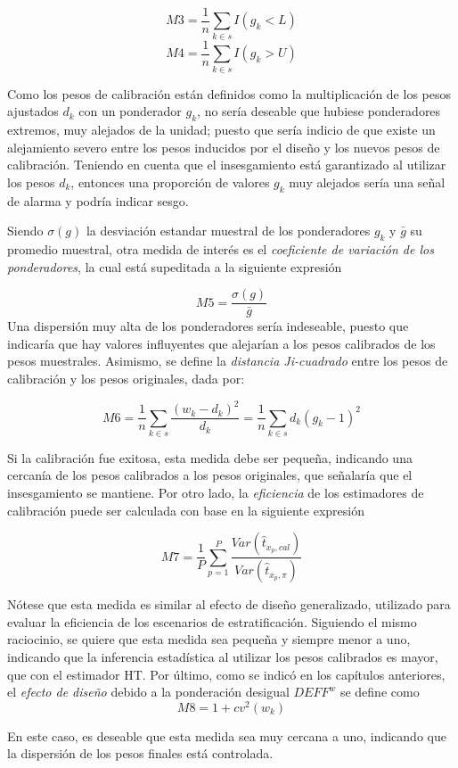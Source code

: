 \documentclass[
  12pt,
]{book}
\begin{document}
\[
M3 = \frac{1}{n} \sum_{k \in s}I(g_k<L)
\]
\[
M4= \frac{1}{n} \sum_{k \in s}I(g_k>U)
\]

Como los pesos de calibración están definidos como la multiplicación de los pesos ajustados \(d_{k}\) con un ponderador \(g_k\), no sería deseable que hubiese ponderadores extremos, muy alejados de la unidad; puesto que sería indicio de que existe un alejamiento severo entre los pesos inducidos por el diseño y los nuevos pesos de calibración. Teniendo en cuenta que el insesgamiento está garantizado al utilizar los pesos \(d_k\), entonces una proporción de valores \(g_k\) muy alejados sería una señal de alarma y podría indicar sesgo.

Siendo \(\sigma(g)\) la desviación estandar muestral de los ponderadores \(g_k\) y \(\bar{g}\) su promedio muestral, otra medida de interés es el \emph{coeficiente de variación de los ponderadores}, la cual está supeditada a la siguiente expresión

\[
M5= \frac{\sigma(g)}{\bar{g}}
\]
Una dispersión muy alta de los ponderadores sería indeseable, puesto que indicaría que hay valores influyentes que alejarían a los pesos calibrados de los pesos muestrales. Asimismo, se define la \emph{distancia Ji-cuadrado} entre los pesos de calibración y los pesos originales, dada por:

\[
M6 = \frac{1}{n}\sum_{k \in s} \frac{(w_k - d_k)^2}{d_k}
= \frac{1}{n}\sum_{k \in s} d_k(g_k - 1)^2
\]

Si la calibración fue exitosa, esta medida debe ser pequeña, indicando una cercanía de los pesos calibrados a los pesos originales, que señalaría que el insesgamiento se mantiene. Por otro lado, la \emph{eficiencia} de los estimadores de calibración puede ser calculada con base en la siguiente expresión

\[
M7 = \frac{1}{P}\sum_{p=1}^P \frac{Var(\hat{t}_{x_p, cal})}{Var(\hat{t}_{x_p, \pi})} 
\]

Nótese que esta medida es similar al efecto de diseño generalizado, utilizado para evaluar la eficiencia de los escenarios de estratificación. Siguiendo el mismo raciocinio, se quiere que esta medida sea pequeña y siempre menor a uno, indicando que la inferencia estadística al utilizar los pesos calibrados es mayor, que con el estimador HT. Por último, como se indicó en los capítulos anteriores, el \emph{efecto de diseño} debido a la ponderación desigual \(DEFF^w\) se define como
\[
M8 = 1+cv^2(w_k)
\]

En este caso, es deseable que esta medida sea muy cercana a uno, indicando que la dispersión de los pesos finales está controlada.
\end{document}
